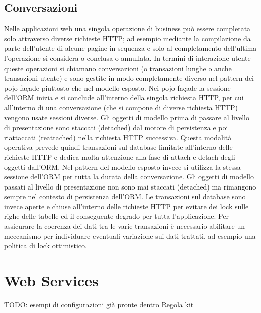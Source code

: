 \subsection{Conversazioni}
Nelle applicazioni web una singola operazione di business può essere completata solo attraverso diverse richieste HTTP; ad esempio mediante la compilazione da parte dell'utente di alcune pagine in sequenza e solo al completamento dell'ultima l'operazione si considera o conclusa o annullata. In termini di interazione utente queste operazioni si chiamano conversazioni (o transazioni lunghe o anche transazioni utente) e sono gestite in modo completamente diverso nel pattern dei pojo façade piuttosto che nel modello esposto.
Nei pojo façade la sessione dell'ORM inizia e si conclude all'interno della singola richiesta HTTP, per cui all'interno di una conversazione (che si compone di diverse richiesta HTTP) vengono usate sessioni diverse. Gli oggetti di modello prima di passare al livello di presentazione sono staccati (detached) dal motore di persistenza  e poi riattaccati (reattached) nella richiesta HTTP successiva. Questa modalità operativa prevede quindi transazioni sul database limitate all'interno delle richieste HTTP e dedica molta attenzione alla fase di attach e detach degli oggetti dall'ORM.
Nel pattern del modello esposto invece si utilizza la stessa sessione dell'ORM per tutta la durata della conversazione. Gli oggetti di modello passati al livello di presentazione non sono mai staccati (detached) ma rimangono sempre nel contesto di persistenza dell'ORM. Le transazioni sul database sono invece aperte e chiuse all'interno delle richieste HTTP per evitare dei lock sulle righe delle tabelle ed il conseguente degrado per tutta l'applicazione. Per assicurare la coerenza dei dati tra le varie transazioni è necessario abilitare un meccanismo per individuare eventuali variazione sui dati trattati, ad esempio una politica di lock ottimistico. 





\section{Web Services}
TODO: esempi di configurazioni già pronte dentro Regola kit